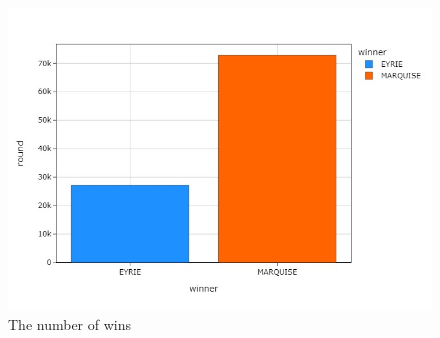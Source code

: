     

\begin{figure}
    \begin{center}
      \includegraphics[width=\textwidth]{./images/fig-random-random-win.jpeg}
    \end{center}
    \caption{The number of wins}
    \label{fig:wins}
  \end{figure}


